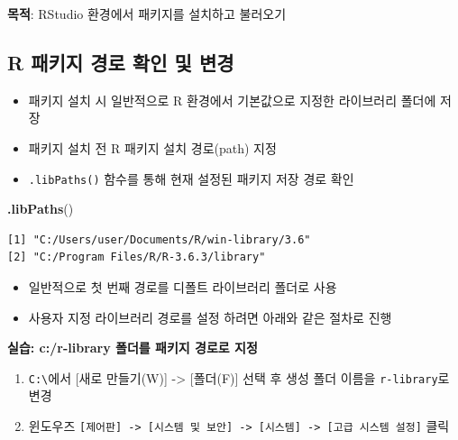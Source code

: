 \documentclass[
  11pt,
]{krantz}
\makeatletter
\newenvironment{Shaded}{\begin{snugshade}}{\end{snugshade}}
\newcommand{\KeywordTok}[1]{\textcolor[rgb]{0.27,0.27,0.27}{\textbf{#1}}}
\newcommand{\NormalTok}[1]{#1}
\providecommand{\tightlist}{%
  \setlength{\itemsep}{0pt}\setlength{\parskip}{0pt}}
\newenvironment{kframe}{%
\medskip{}
\setlength{\fboxsep}{.8em}
 \def\at@end@of@kframe{}%
 \ifinner\ifhmode%
  \def\at@end@of@kframe{\end{minipage}}%
  \begin{minipage}{\columnwidth}%
 \fi\fi%
 \def\FrameCommand##1{\hskip\@totalleftmargin \hskip-\fboxsep
 \colorbox{shadecolor}{##1}\hskip-\fboxsep
     \hskip-\linewidth \hskip-\@totalleftmargin \hskip\columnwidth}%
 \MakeFramed {\advance\hsize-\width
   \@totalleftmargin\z@ \linewidth\hsize
   \@setminipage}}%
 {\par\unskip\endMakeFramed%
 \at@end@of@kframe}
\renewenvironment{quote}{\begin{kframe}}{\end{kframe}}
\makeatother
\begin{document}
\textbf{목적}: RStudio 환경에서 패키지를 설치하고 불러오기

\normalsize

\hypertarget{r-package-path}{%
\subsection{R 패키지 경로 확인 및 변경}\label{r-package-path}}

\begin{itemize}
\tightlist
\item
  패키지 설치 시 일반적으로 R 환경에서 기본값으로 지정한 라이브러리 폴더에 저장
\item
  패키지 설치 전 R 패키지 설치 경로(path) 지정
\item
  \texttt{.libPaths()} 함수를 통해 현재 설정된 패키지 저장 경로 확인
\end{itemize}

\footnotesize

\begin{Shaded}
\begin{Highlighting}[]
\KeywordTok{.libPaths}\NormalTok{()}
\end{Highlighting}
\end{Shaded}

\begin{verbatim}
[1] "C:/Users/user/Documents/R/win-library/3.6"
[2] "C:/Program Files/R/R-3.6.3/library"       
\end{verbatim}

\normalsize

\begin{itemize}
\tightlist
\item
  일반적으로 첫 번째 경로를 디폴트 라이브러리 폴더로 사용
\item
  사용자 지정 라이브러리 경로를 설정 하려면 아래와 같은 절차로 진행
\end{itemize}

\begin{quote}
\textbf{실습: c:/r-library 폴더를 패키지 경로로 지정}
\end{quote}

\begin{enumerate}
\def\labelenumi{\arabic{enumi})}
\item
  \texttt{C:\textbackslash{}}에서 {[}새로 만들기(W){]} -\textgreater{} {[}폴더(F){]} 선택 후 생성 폴더 이름을 \texttt{r-library}로 변경
\item
  윈도우즈 \texttt{{[}제어판{]}\ -\textgreater{}\ {[}시스템\ 및\ 보안{]}\ -\textgreater{}\ {[}시스템{]}\ -\textgreater{}\ {[}고급\ 시스템\ 설정{]}} 클릭
\end{enumerate}
\end{document}
